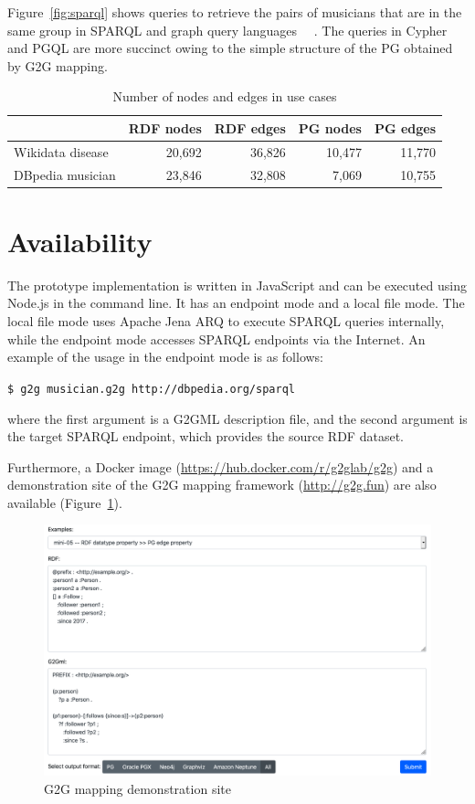 \documentclass[runningheads]{llncs}
\begin{document}
Figure~\ref{fig:sparql} shows queries to retrieve the pairs of musicians that are in the same group in SPARQL and graph query languages ~\cite{openCypher}~\cite{pgql}. The queries in Cypher and PGQL are more succinct owing to the simple structure of the PG obtained by G2G mapping.

\begin{table}[h]
    \centering
    \begin{tabular}{l|r|r|r|r}
        \hline
        & RDF nodes & RDF edges & PG nodes & PG edges \\
        \hline
        Wikidata disease & 20,692 & 36,826 & 10,477 & 11,770 \\
        DBpedia musician & 23,846 & 32,808 & 7,069 & 10,755 \\
        \hline
    \end{tabular}
    \caption{Number of nodes and edges in use cases}
    \label{table:numbers}
\end{table}


\section{Availability}
The prototype implementation is written in JavaScript and can be executed using Node.js in the command line. It has an endpoint mode and a local file mode. The local file mode uses Apache Jena ARQ to execute SPARQL queries internally, while the endpoint mode accesses SPARQL endpoints via the Internet. An example of the usage in the endpoint mode is as follows:

\texttt{\$ g2g musician.g2g http://dbpedia.org/sparql}

\noindent where the first argument is a G2GML description file, and the second argument is the target SPARQL endpoint, which provides the source RDF dataset.

Furthermore, a Docker image (\url{https://hub.docker.com/r/g2glab/g2g}) and a demonstration site of the G2G mapping framework (\url{http://g2g.fun}) are also available (Figure~\ref{fig:sandbox}).

\begin{figure}
\center
\includegraphics[width=1.0\textwidth]{sandbox.png}
\caption{G2G mapping demonstration site}
\label{fig:sandbox}
\end{figure}
\end{document}
